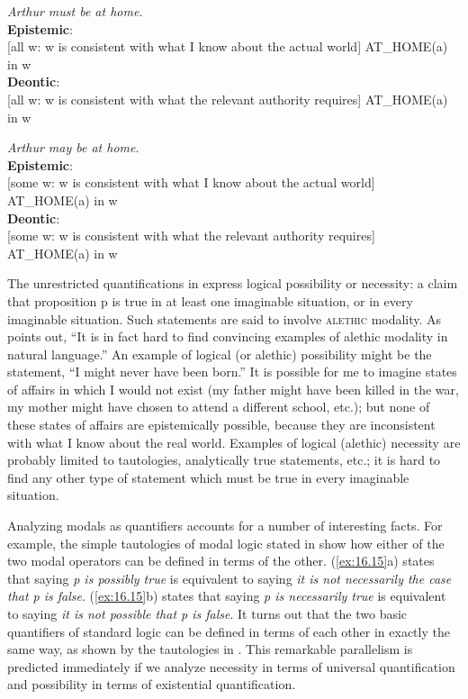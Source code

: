 \ea \label{ex:16.13}
\textit{Arthur must be at home}.\\
\ea
\textbf{Epistemic}:\\
{}[all w: w is consistent with what I know about the actual world] AT\_HOME(a) in w\\
\ex \textbf{Deontic}:\\
{}[all w: w is consistent with what the relevant authority requires] AT\_HOME(a) in w
\z
\z

\ea \label{ex:16.14}
\textit{Arthur may be at home}.\\
\ea \textbf{Epistemic}:\\
{}[some w: w is consistent with what I know about the actual world] AT\_HOME(a) in w\\
\ex \textbf{Deontic}:\\
{}[some w: w is consistent with what the relevant authority requires] AT\_HOME(a) in w
\z
\z


The unrestricted quantifications in  express logical possibility or necessity: a claim that proposition p is true in at least one imaginable situation, or in every imaginable situation. Such statements are said to involve \textsc{alethic} modality. As  \citet{vonFintel2006} points out, “It is in fact hard to find convincing examples of alethic modality in natural language.” An example of logical (or alethic) possibility might be the statement, “I might never have been born.” It is possible for me to imagine states of affairs in which I would not exist (my father might have been killed in the war, my mother might have chosen to attend a different school, etc.); but none of these states of affairs are epistemically possible, because they are inconsistent with what I know about the real world. Examples of logical (alethic) necessity are probably limited to tautologies, analytically true statements, etc.; it is hard to find any other type of statement which must be true in every imaginable situation.



Analyzing modals as quantifiers accounts for a number of interesting facts. For example, the simple tautologies of modal logic stated in  show how either of the two modal operators can be defined in terms of the other. (\ref{ex:16.15}a) states that saying \textit{p is possibly true} is equivalent to saying \textit{it is not necessarily the case that p is false}. (\ref{ex:16.15}b) states that saying \textit{p is necessarily true} is equivalent to saying \textit{it is not possible that p is false}. It turns out that the two basic quantifiers of standard logic can be defined in terms of each other in exactly the same way, as shown by the tautologies in . This remarkable parallelism is predicted immediately if we analyze necessity in terms of universal quantification and possibility in terms of existential quantification.


